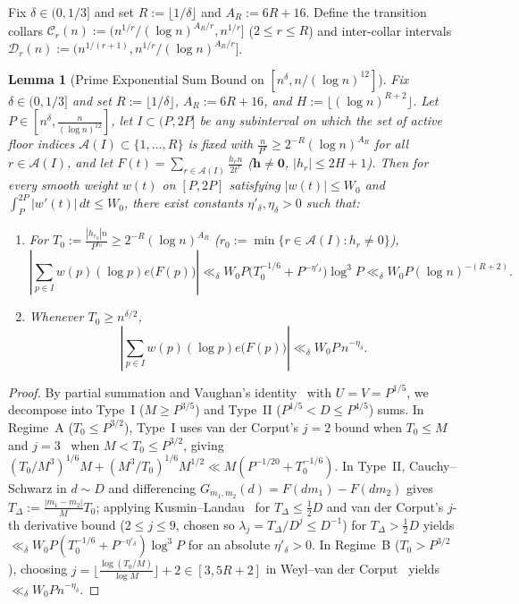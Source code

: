 \documentclass[11pt,reqno]{amsart}
\newtheorem{lemma}[theorem]{Lemma}
\theoremstyle{remark}
\begin{document}
Fix $\delta \in (0, 1/3]$ and set $R := \lfloor 1/\delta \rfloor$ and $A_R := 6R + 16$. Define the transition collars $\mathcal{C}_r(n) := (n^{1/r}/(\log n)^{A_R/r}, n^{1/r}]$ ($2 \le r \le R$) and inter-collar intervals $\mathcal{D}_r(n) := (n^{1/(r+1)}, n^{1/r}/(\log n)^{A_R/r}]$.

\begin{lemma}[Prime Exponential Sum Bound on ${[n^\delta, n/(\log n)^{12}]}$]\label{lem:2.4}
Fix $\delta \in (0, 1/3]$ and set $R := \lfloor 1/\delta \rfloor$, $A_R := 6R + 16$, and $H := \lfloor (\log n)^{R+2} \rfloor$. Let $P \in [n^\delta, \frac{n}{(\log n)^{12}}]$, let $I \subset (P, 2P]$ be any subinterval on which the set of active floor indices $\mathcal{A}(I) \subset \{1, \dots, R\}$ is fixed with $\frac{n}{P^r} \ge 2^{-R}(\log n)^{A_R}$ for all $r \in \mathcal{A}(I)$, and let $F(t) = \sum_{r \in \mathcal{A}(I)} \frac{h_r n}{2t^r}$ ($\mathbf{h} \ne \mathbf{0}$, $|h_r| \le 2H+1$). Then for every smooth weight $w(t)$ on $[P, 2P]$ satisfying $|w(t)| \le W_0$ and $\int_P^{2P} |w'(t)|\,dt \le W_0$, there exist constants $\eta'_\delta, \eta_\delta > 0$ such that:
\begin{enumerate}
\item[(i)] For $T_0 := \frac{|h_{r_0}| n}{P^{r_0}} \ge 2^{-R}(\log n)^{A_R}$ ($r_0 := \min\{r \in \mathcal{A}(I) : h_r \ne 0\}$),
\begin{equation}\label{eq:lem24-i}
\left|\sum_{p \in I} w(p)(\log p) e\bigl(F(p)\bigr)\right| \ll_\delta W_0 P \bigl(T_0^{-1/6} + P^{-\eta'_\delta}\bigr) \log^3 P \ll_\delta W_0 P (\log n)^{-(R+2)}.
\end{equation}
\item[(ii)] Whenever $T_0 \ge n^{\delta/2}$,
\begin{equation}\label{eq:lem24-ii}
\left|\sum_{p \in I} w(p)(\log p) e\bigl(F(p)\bigr)\right| \ll_\delta W_0 P\, n^{-\eta_\delta}.
\end{equation}
\end{enumerate}
\end{lemma}
\begin{proof}
By partial summation and Vaughan's identity~\cite[Proposition~13.4]{IwaniecKowalski2004} with $U = V = P^{1/5}$, we decompose into Type~I ($M \ge P^{3/5}$) and Type~II ($P^{1/5} < D \le P^{4/5}$) sums. In Regime~A ($T_0 \le P^{3/2}$), Type~I uses van der Corput's $j=2$ bound when $T_0 \le M$ and $j=3$~\cite[Corollary~8.13]{IwaniecKowalski2004} when $M < T_0 \le P^{3/2}$, giving $(T_0/M^3)^{1/6} M + (M^3/T_0)^{1/6} M^{1/2} \ll M(P^{-1/20} + T_0^{-1/6})$. In Type~II, Cauchy--Schwarz in $d \sim D$ and differencing $G_{m_1, m_2}(d) = F(dm_1) - F(dm_2)$ gives $T_\Delta := \frac{|m_1 - m_2|}{M} T_0$; applying Kusmin--Landau~\cite[Corollary~8.11]{IwaniecKowalski2004} for $T_\Delta \le \frac{1}{2}D$ and van der Corput's $j$-th derivative bound ($2 \le j \le 9$, chosen so $\lambda_j = T_\Delta / D^j \le D^{-1}$) for $T_\Delta > \frac{1}{2}D$ yields $\ll_\delta W_0 P(T_0^{-1/6} + P^{-\eta'_\delta})\log^3 P$ for an absolute $\eta'_\delta > 0$. In Regime~B ($T_0 > P^{3/2}$), choosing $j = \lfloor \frac{\log(T_0/M)}{\log M} \rfloor + 2 \in [3, 5R+2]$ in Weyl--van der Corput~\cite[Theorem~8.25]{IwaniecKowalski2004} yields $\ll_\delta W_0 P n^{-\eta_\delta}$.
\end{proof}
\end{document}
